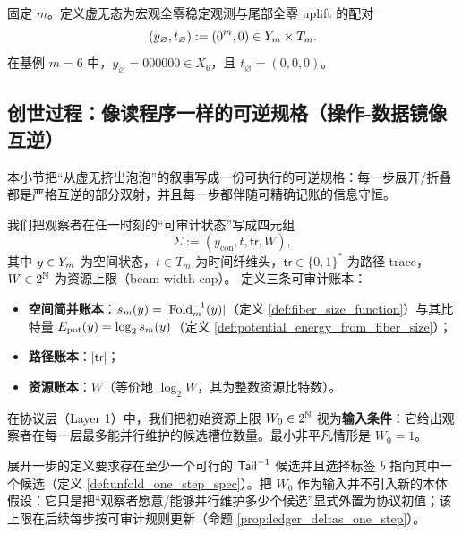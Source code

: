 \begin{definition}[虚无态（零态）]\label{def:void_state}
固定 \(m\)。定义虚无态为宏观全零稳定观测与尾部全零 uplift 的配对
$$
(y_{\varnothing},t_{\varnothing}) := (0^m,0)\in Y_m\times T_m.
$$
在基例 \(m=6\) 中，\(y_{\varnothing}=000000\in X_6\)，且 \(t_{\varnothing}=(0,0,0)\)。
\end{definition}

\subsection{创世过程：像读程序一样的可逆规格（操作-数据镜像互逆）}\label{subsec:genesis_process_spec}
本小节把“从虚无挤出泡泡”的叙事写成一份可执行的可逆规格：每一步展开/折叠都是严格互逆的部分双射，并且每一步都伴随可精确记账的信息守恒。

\begin{definition}[观察者的完整状态与三条守恒账本]\label{def:full_state_and_ledgers}
我们把观察者在任一时刻的“可审计状态”写成四元组
$$
\Sigma:=(y_{\mathrm{con}},t,\mathsf{tr},W),
$$
其中 \(y\in Y_m\) 为空间状态，\(t\in T_m\) 为时间纤维头，\(\mathsf{tr}\in\{0,1\}^\ast\) 为路径 trace，\(W\in 2^{\mathbb{N}}\) 为资源上限（beam width cap）。
定义三条可审计账本：
\begin{itemize}
  \item \textbf{空间简并账本}：\(s_m(y)=|\mathrm{Fold}_m^{-1}(y)|\)（定义 \ref{def:fiber_size_function}）与其比特量 \(E_{\mathrm{pot}}(y)=\log_2 s_m(y)\)（定义 \ref{def:potential_energy_from_fiber_size}）；
  \item \textbf{路径账本}：\(|\mathsf{tr}|\)；
  \item \textbf{资源账本}：\(W\)（等价地 \(\log_2 W\)，其为整数资源比特数）。
\end{itemize}
\end{definition}

\begin{definition}[初始资源寄存器]\label{def:initial_resource_tape}
在协议层（Layer 1）中，我们把初始资源上限 \(W_0\in 2^{\mathbb{N}}\) 视为\textbf{输入条件}：它给出观察者在每一层最多能并行维护的候选槽位数量。最小非平凡情形是 \(W_0=1\)。
\end{definition}

\begin{remark}
展开一步的定义要求存在至少一个可行的 \(\mathsf{Tail}^{-1}\) 候选并且选择标签 \(b\) 指向其中一个候选（定义 \ref{def:unfold_one_step_spec}）。把 \(W_0\) 作为输入并不引入新的本体假设：它只是把“观察者愿意/能够并行维护多少个候选”显式外置为协议初值；该上限在后续每步按可审计规则更新（命题 \ref{prop:ledger_deltas_one_step}）。
\end{remark}

